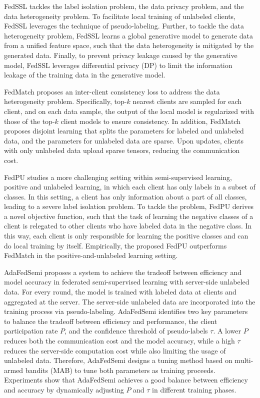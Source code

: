 \documentclass[11pt]{article}
\begin{document}
FedSSL \cite{Yilun-fan2022private} tackles the label isolation problem, the data privacy problem, and the data heterogeneity problem. To facilitate local training of unlabeled clients, FedSSL leverages the technique of pseudo-labeling. Further, to tackle the data heterogeneity problem, FedSSL learns a global generative model to generate data from a unified feature space, such that the data heterogeneity is mitigated by the generated data. Finally, to prevent privacy leakage caused by the generative model, FedSSL leverages differential privacy (DP) to limit the information leakage of the training data in the generative model.

FedMatch \cite{Yilun-jeong2021federated} proposes an inter-client consistency loss to address the data heterogeneity problem. Specifically, top-$k$ nearest clients are sampled for each client, and on each data sample, the output of the local model is regularized with those of the top-$k$ client models to ensure consistency. In addition, FedMatch proposes disjoint learning that splits the parameters for labeled and unlabeled data, and the parameters for unlabeled data are sparse. Upon updates, clients with only unlabeled data upload sparse tensors, reducing the communication cost.

FedPU \cite{Yilun-lin2022federated} studies a more challenging setting within semi-supervised learning, positive and unlabeled learning, in which each client has only labels in a subset of classes. In this setting, a client has only information about a part of all classes, leading to a severe label isolation problem. To tackle the problem, FedPU derives a novel objective function, such that the task of learning the negative classes of a client is relegated to other clients who have labeled data in the negative class. In this way, each client is only responsible for learning the positive classes and can do local training by itself. Empirically, the proposed FedPU outperforms FedMatch \cite{Yilun-jeong2021federated} in the positive-and-unlabeled learning setting.

AdaFedSemi \cite{Yilun-wang2022enhancing} proposes a system to achieve the tradeoff between efficiency and model accuracy in federated semi-supervised learning with server-side unlabeled data. For every round, the model is trained with labeled data at clients and aggregated at the server. The server-side unlabeled data are incorporated into the training process via pseudo-labeling. AdaFedSemi \cite{Yilun-wang2022enhancing} identifies two key parameters to balance the tradeoff between efficiency and performance, the client participation rate $P$, and the confidence threshold of pseudo-labels $\tau$. A lower $P$ reduces both the communication cost and the model accuracy, while a high $\tau$ reduces the server-side computation cost while also limiting the usage of unlabeled data. Therefore, AdaFedSemi designs a tuning method based on multi-armed bandits (MAB) to tune both parameters as training proceeds. Experiments show that AdaFedSemi achieves a good balance between efficiency and accuracy by dynamically adjusting $P$ and $\tau$ in different training phases.
\end{document}
